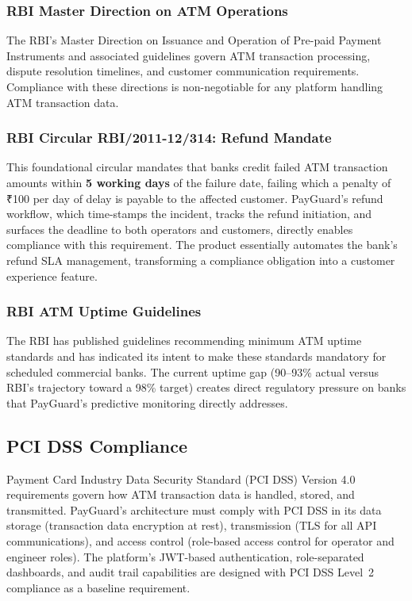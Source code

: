\documentclass[12pt,a4paper]{article}
\newcommand{\inr}{₹}
\begin{document}
\subsubsection{RBI Master Direction on ATM Operations}

The RBI's Master Direction on Issuance and Operation of Pre-paid Payment Instruments and
associated guidelines govern ATM transaction processing, dispute resolution timelines, and
customer communication requirements. Compliance with these directions is non-negotiable for
any platform handling ATM transaction data.

\subsubsection{RBI Circular RBI/2011-12/314: Refund Mandate}

This foundational circular \citep{rbi2011circular} mandates that banks credit failed ATM
transaction amounts within \textbf{5 working days} of the failure date, failing which a penalty
of \inr{}100 per day of delay is payable to the affected customer. PayGuard's refund workflow,
which time-stamps the incident, tracks the refund initiation, and surfaces the deadline to both
operators and customers, directly enables compliance with this requirement. The product
essentially automates the bank's refund SLA management, transforming a compliance obligation
into a customer experience feature.

\subsubsection{RBI ATM Uptime Guidelines}

The RBI has published guidelines recommending minimum ATM uptime standards and has indicated
its intent to make these standards mandatory for scheduled commercial banks. The current uptime
gap (90--93\% actual versus RBI's trajectory toward a 98\% target) creates direct regulatory
pressure on banks that PayGuard's predictive monitoring directly addresses.

\subsection{PCI DSS Compliance}

Payment Card Industry Data Security Standard (PCI DSS) Version 4.0 \citep{pcidss2022}
requirements govern how ATM transaction data is handled, stored, and transmitted. PayGuard's
architecture must comply with PCI DSS in its data storage (transaction data encryption at
rest), transmission (TLS for all API communications), and access control (role-based access
control for operator and engineer roles). The platform's JWT-based authentication,
role-separated dashboards, and audit trail capabilities are designed with PCI DSS Level~2
compliance as a baseline requirement.
\end{document}
